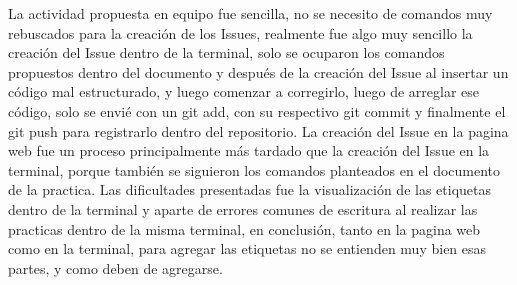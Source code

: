La actividad propuesta en equipo fue sencilla, no se necesito de comandos muy rebuscados
para la creación de los Issues, realmente fue algo muy sencillo la creación del Issue
dentro de la terminal, solo se ocuparon los comandos propuestos dentro del documento y
después de la creación del Issue al insertar un código mal estructurado, y luego comenzar
a corregirlo, luego de arreglar ese código, solo se envié con un git add, con su respectivo
git commit y finalmente el git push para registrarlo dentro del repositorio.
La creación del Issue en la pagina web fue un proceso principalmente más tardado que
la creación del Issue en la terminal, porque también se siguieron los comandos planteados
en el documento de la practica. Las dificultades presentadas fue la visualización de las
etiquetas dentro de la terminal y aparte de errores comunes de escritura al realizar las
practicas dentro de la misma terminal, en conclusión, tanto en la pagina web como en la
terminal, para agregar las etiquetas no se entienden muy bien esas partes, y como deben
de agregarse.